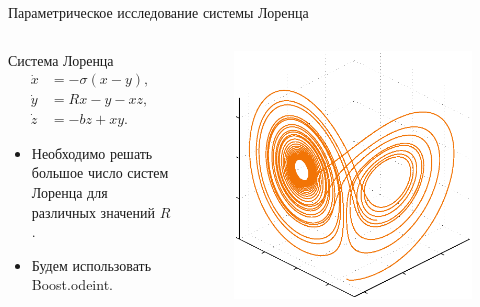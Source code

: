 \documentclass[@BEAMER_OPTIONS@]{beamer}
\begin{document}
\begin{frame}[fragile]{Параметрическое исследование системы Лоренца}
    \begin{columns}
        \begin{column}{0.6\textwidth}
            \begin{block}{Система Лоренца}
                \vspace{-1\baselineskip}
                \begin{align*}
                    \dot{x} &= -\sigma \left( x - y \right), \\
                    \dot{y} &= R x - y - xz, \\
                    \dot{z} &= -bz + xy.
                    \label{eq:lorenz}
                \end{align*}
            \end{block}
            \begin{itemize}
                \item Необходимо решать большое число систем Лоренца
                    для различных значений $R$.
                \item Будем использовать Boost.odeint.
            \end{itemize}
        \end{column}
        \begin{column}{0.4\textwidth}
            \begin{figure}
                \includegraphics[width=\textwidth]{lorenz}
            \end{figure}
        \end{column}
    \end{columns}
\end{frame}
\end{document}
